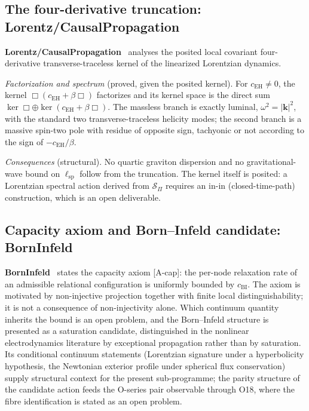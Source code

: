 \documentclass[11pt,a4paper]{article}
\theoremstyle{definition}
\newcommand{\SPI}{\mathcal{S}_\Pi}
\newcommand{\lsp}{\ell_{\mathrm{sp}}}
\newcommand{\cEH}{c_{\mathrm{EH}}}
\newcommand{\cBI}{c_{\mathrm{BI}}}
\begin{document}
    \subsection{The four-derivative truncation: Lorentz/CausalPropagation}
      \label{sec:lorentz}

      \textbf{Lorentz/CausalPropagation}~\cite{Beau2026i} analyses the posited local
      covariant four-derivative transverse-traceless kernel of the linearized Lorentzian
      dynamics.

      \textit{Factorization and spectrum} (proved, given the posited kernel).
      For $\cEH \neq 0$, the kernel $\Box(\cEH + \beta\Box)$ factorizes and its kernel space
      is the direct sum $\ker\Box \oplus \ker(\cEH + \beta\Box)$.
      The massless branch is exactly luminal, $\omega^2 = |\mathbf{k}|^2$, with the standard
      two transverse-traceless helicity modes; the second branch is a massive spin-two pole
      with residue of opposite sign, tachyonic or not according to the sign of
      $-\cEH/\beta$.

      \textit{Consequences} (structural).
      No quartic graviton dispersion and no gravitational-wave bound on $\lsp$ follow from
      the truncation.
      The kernel itself is posited: a Lorentzian spectral action derived from $\SPI$
      requires an in-in (closed-time-path) construction, which is an open deliverable.

    \subsection{Capacity axiom and Born--Infeld candidate: BornInfeld}
      \label{sec:bi}

      \textbf{BornInfeld}~\cite{Beau2026c} states the capacity axiom [A-cap]: the per-node
      relaxation rate of an admissible relational configuration is uniformly bounded by
      $\cBI$.
      The axiom is motivated by non-injective projection together with finite local
      distinguishability; it is not a consequence of non-injectivity alone.
      Which continuum quantity inherits the bound is an open problem, and the Born--Infeld
      structure is presented as a saturation candidate, distinguished in the nonlinear
      electrodynamics literature by exceptional propagation rather than by saturation.
      Its conditional continuum statements (Lorentzian signature under a hyperbolicity
      hypothesis, the Newtonian exterior profile under spherical flux conservation) supply
      structural context for the present sub-programme; the parity structure of the
      candidate action feeds the O-series pair observable through O18, where the fibre
      identification is stated as an open problem.
\end{document}
